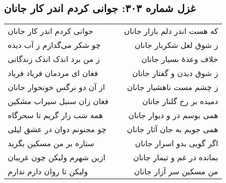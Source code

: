 \begin{center}
\section*{غزل شماره ۳۰۳: جوانی کردم اندر کار جانان}
\label{sec:303}
\begin{longtable}{l p{0.5cm} r}
جوانی کردم اندر کار جانان
&&
که هست اندر دلم بازار جانان
\\
چو شکر می‌گدازم ز آب دیده
&&
ز شوق لعل شکربار جانان
\\
ز من برد اندک اندک زندگانی
&&
خلاف وعدهٔ بسیار جانان
\\
فغان ای مردمان فریاد فریاد
&&
ز شوق دیدن و گفتار جانان
\\
از آن دو نرگس خونخوار جانان
&&
ز چشم مست ناهشیار جانان
\\
فغان زان سنبل سیراب مشکین
&&
دمیده بر رخ گلنار جانان
\\
همه شب زار گریم تا سحرگاه
&&
همی بوسم در و دیوار جانان
\\
چو مجنونم دوان در عشق لیلی
&&
همی جویم به جان آثار جانان
\\
ستاره بر من مسکین بگرید
&&
اگر گویی بدو اسرار جانان
\\
ازین شهرم ولیکن چون غریبان
&&
بمانده در غم و تیمار جانان
\\
ولیکن تا روان دارم ندارم
&&
من مسکین سر آزار جانان
\\
\end{longtable}
\end{center}
